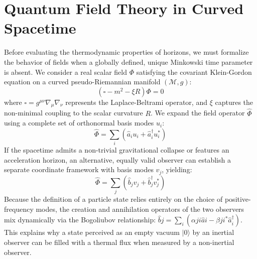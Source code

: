 \documentclass[11pt,a4paper]{article}
\begin{document}
\section{Quantum Field Theory in Curved Spacetime}
Before evaluating the thermodynamic properties of horizons, we must formalize the behavior of fields when a globally defined, unique Minkowski time parameter is absent. We consider a real scalar field $\Phi$ satisfying the covariant Klein-Gordon equation on a curved pseudo-Riemannian manifold $(\mathcal{M}, g)$:
\begin{equation}
\left( \square - m^2 - \xi R \right) \Phi = 0
\end{equation}
where $\square = g^{\mu\nu}\nabla_\mu\nabla_\nu$ represents the Laplace-Beltrami operator, and $\xi$ captures the non-minimal coupling to the scalar curvature $R$. We expand the field operator $\hat{\Phi}$ using a complete set of orthonormal basis modes $u_i$:
\begin{equation}
\hat{\Phi} = \sum_i \left( \hat{a}_i u_i + \hat{a}_i^{\dagger} u_i^* \right)
\end{equation}
If the spacetime admits a non-trivial gravitational collapse or features an acceleration horizon, an alternative, equally valid observer can establish a separate coordinate framework with basis modes $v_j$, yielding:
\begin{equation}
\hat{\Phi} = \sum_j \left( \hat{b}_j v_j + \hat{b}_j^{\dagger} v_j^* \right)
\end{equation}
Because the definition of a particle state relies entirely on the choice of positive-frequency modes, the creation and annihilation operators of the two observers mix dynamically via the Bogoliubov relationship: $\hat{b}j = \sum_i (\alpha{ji}\hat{a}i - \beta{ji}^*\hat{a}_i^{\dagger})$. This explains why a state perceived as an empty vacuum $|0\rangle$ by an inertial observer can be filled with a thermal flux when measured by a non-inertial observer.
\end{document}
